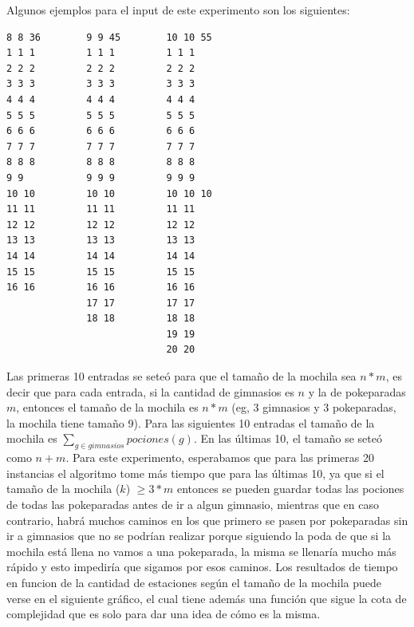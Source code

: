       Algunos ejemplos para el input de este experimento son los siguientes:


      \begin{codesnippet}
\begin{verbatim}
8 8 36        9 9 45        10 10 55
1 1 1         1 1 1         1 1 1
2 2 2         2 2 2         2 2 2
3 3 3         3 3 3         3 3 3
4 4 4         4 4 4         4 4 4
5 5 5         5 5 5         5 5 5
6 6 6         6 6 6         6 6 6
7 7 7         7 7 7         7 7 7
8 8 8         8 8 8         8 8 8
9 9           9 9 9         9 9 9
10 10         10 10         10 10 10
11 11         11 11         11 11
12 12         12 12         12 12
13 13         13 13         13 13
14 14         14 14         14 14
15 15         15 15         15 15
16 16         16 16         16 16
              17 17         17 17
              18 18         18 18
                            19 19
                            20 20

\end{verbatim}
      \end{codesnippet}

      Las primeras 10 entradas se seteó para que el tamaño de la mochila sea $n*m$, es decir que para cada entrada, si la cantidad de gimnasios es $n$ y la de pokeparadas $m$, entonces el tamaño de la mochila es $n*m$ (eg, 3 gimnasios y 3 pokeparadas, la mochila tiene tamaño 9). Para las siguientes 10 entradas el tamaño de la mochila es $\sum_{g \in gimnasios} pociones(g)$. En las últimas 10, el tamaño se seteó como $n+m$. 
      Para este experimento, esperabamos que para las primeras 20 instancias el algoritmo tome más tiempo que para las últimas 10, ya que si el tamaño de la mochila ($k$) $\geq 3*m$ entonces se pueden guardar todas las pociones de todas las pokeparadas antes de ir a algun gimnasio, mientras que en caso contrario, habrá muchos caminos en los que primero se pasen por pokeparadas sin ir a gimnasios que no se podrían realizar porque siguiendo la poda de que si la mochila está llena no vamos a una pokeparada, la misma se llenaría mucho más rápido y esto impediría que sigamos por esos caminos.
      Los resultados de tiempo en funcion de la cantidad de estaciones según el tamaño de la mochila puede verse en el siguiente gráfico, el cual tiene además una función que sigue la cota de complejidad que es solo para dar una idea de cómo es la misma.

